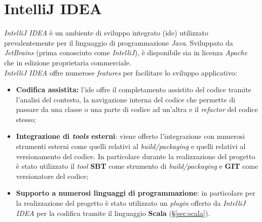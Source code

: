 \section{IntelliJ IDEA}
\textit{IntelliJ IDEA} è un ambiente di sviluppo integrato (\gls{ide}) utilizzato prevalentemente per il linguaggio di programmazione \textit{Java}. Sviluppato da \textit{JetBrains} (prima conosciuto come \textit{IntelliJ}), è disponibile sia in licenza \textit{Apache} che in edizione proprietaria commerciale.\\
\textit{IntelliJ IDEA} offre numerose \textit{features} per facilitare lo sviluppo applicativo:
\begin{itemize}
	\item{\textbf{Codifica assistita:} l'\gls{ide} offre il completamento assistito del codice tramite l'analisi del contesto, la navigazione interna del codice che permette di passare da una classe o una parte di codice ad un'altra e il \textit{refactor} del codice stesso;}
	\item{\textbf{Integrazione di \textit{tools} esterni}: viene offerto l'integrazione con numerosi strumenti esterni come quelli relativi al \textit{build/packaging} e quelli relativi al versionamento del codice. In particolare durante la realizzazione del progetto è stato utilizzato il \textit{tool} \textbf{SBT} come strumento di \textit{build/packaging} e \textbf{GIT} come versionatore del codice;}
	\item{\textbf{Supporto a numerosi linguaggi di programmazione}: in particolare per la realizzazione del progetto è stato utilizzato un \textit{plugin} offerto da \textit{IntelliJ IDEA} per la codifica tramite il linguaggio \textbf{Scala} (\S\ref{sec:scala}).}
\end{itemize}

